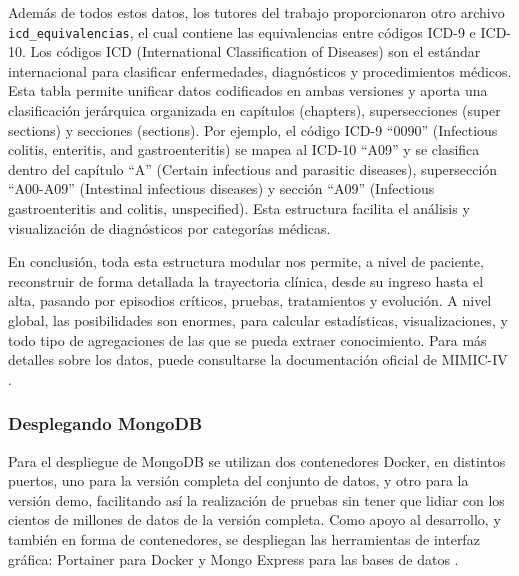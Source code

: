 Además de todos estos datos, los tutores del trabajo proporcionaron otro archivo \texttt{icd\_equivalencias}, el cual contiene las equivalencias entre códigos ICD-9 e ICD-10. Los códigos ICD (International Classification of Diseases) son el estándar internacional para clasificar enfermedades, diagnósticos y procedimientos médicos. Esta tabla permite unificar datos codificados en ambas versiones y aporta una clasificación jerárquica organizada en capítulos (chapters), supersecciones (super sections) y secciones (sections). Por ejemplo, el código ICD-9 ``0090'' (Infectious colitis, enteritis, and gastroenteritis) se mapea al ICD-10 ``A09'' y se clasifica dentro del capítulo ``A'' (Certain infectious and parasitic diseases), supersección ``A00-A09'' (Intestinal infectious diseases) y sección ``A09'' (Infectious gastroenteritis and colitis, unspecified). Esta estructura facilita el análisis y visualización de diagnósticos por categorías médicas.

En conclusión, toda esta estructura modular nos permite, a nivel de paciente, reconstruir de forma detallada la trayectoria clínica, desde su ingreso hasta el alta, pasando por episodios críticos, pruebas, tratamientos y evolución. A nivel global, las posibilidades son enormes, para calcular estadísticas, visualizaciones, y todo tipo de agregaciones de las que se pueda extraer conocimiento. Para más detalles sobre los datos, puede consultarse la documentación oficial de MIMIC-IV \cite{MIMICIV_docs}.

\subsubsection{Desplegando MongoDB}

Para el despliegue de MongoDB se utilizan dos contenedores Docker, en distintos puertos, uno para la versión completa del conjunto de datos, y otro para la versión demo, facilitando así la realización de pruebas sin tener que lidiar con los cientos de millones de datos de la versión completa. Como apoyo al desarrollo, y también en forma de contenedores, se despliegan las herramientas de interfaz gráfica: Portainer para Docker \cite{portainer_ce} y Mongo Express para las bases de datos \cite{mongo_express}. 


